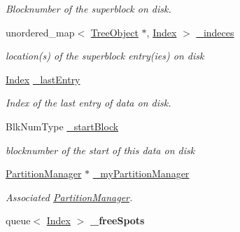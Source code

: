 \begin{DoxyCompactItemize}
\begin{DoxyCompactList}\small\item\em Blocknumber of the superblock on disk. \end{DoxyCompactList}\item 
\mbox{\label{classTreeObject_ae79eb5bd12c820b50f5d10c3f9b5dc66}} 
unordered\+\_\+map$<$ \mbox{\hyperlink{classTreeObject}{Tree\+Object}} $\ast$, \mbox{\hyperlink{structindex}{Index}} $>$ \mbox{\hyperlink{classTreeObject_ae79eb5bd12c820b50f5d10c3f9b5dc66}{\+\_\+indeces}}
\begin{DoxyCompactList}\small\item\em location(s) of the superblock entry(ies) on disk \end{DoxyCompactList}\item 
\mbox{\label{classTreeObject_a1418b7078e9fbb06506a310ad9417c52}} 
\mbox{\hyperlink{structindex}{Index}} \mbox{\hyperlink{classTreeObject_a1418b7078e9fbb06506a310ad9417c52}{\+\_\+last\+Entry}}
\begin{DoxyCompactList}\small\item\em Index of the last entry of data on disk. \end{DoxyCompactList}\item 
\mbox{\label{classTreeObject_a5872ffdaa0c1a0cbf393da9a8a7657f3}} 
Blk\+Num\+Type \mbox{\hyperlink{classTreeObject_a5872ffdaa0c1a0cbf393da9a8a7657f3}{\+\_\+start\+Block}}
\begin{DoxyCompactList}\small\item\em blocknumber of the start of this data on disk \end{DoxyCompactList}\item 
\mbox{\label{classTreeObject_a0b2ab130a5b95945bbd81250f667d63b}} 
\mbox{\hyperlink{classPartitionManager}{Partition\+Manager}} $\ast$ \mbox{\hyperlink{classTreeObject_a0b2ab130a5b95945bbd81250f667d63b}{\+\_\+my\+Partition\+Manager}}
\begin{DoxyCompactList}\small\item\em Associated \mbox{\hyperlink{classPartitionManager}{Partition\+Manager}}. \end{DoxyCompactList}\item 
\mbox{\label{classTreeObject_a43defc5d87c903cdc3e36edc3323ef87}} 
queue$<$ \mbox{\hyperlink{structindex}{Index}} $>$ {\bfseries \+\_\+free\+Spots}
\end{DoxyCompactItemize}


